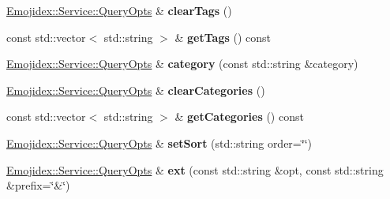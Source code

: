 \begin{DoxyCompactItemize}
\item 
\hyperlink{classEmojidex_1_1Service_1_1QueryOpts}{Emojidex\+::\+Service\+::\+Query\+Opts} \& {\bfseries clear\+Tags} ()\hypertarget{classEmojidex_1_1Service_1_1QueryOpts_a04cb66831c992b892b1ca80228bcffae}{}\label{classEmojidex_1_1Service_1_1QueryOpts_a04cb66831c992b892b1ca80228bcffae}

\item 
const std\+::vector$<$ std\+::string $>$ \& {\bfseries get\+Tags} () const \hypertarget{classEmojidex_1_1Service_1_1QueryOpts_a0085f26b918a3466ea8524e754f30598}{}\label{classEmojidex_1_1Service_1_1QueryOpts_a0085f26b918a3466ea8524e754f30598}

\item 
\hyperlink{classEmojidex_1_1Service_1_1QueryOpts}{Emojidex\+::\+Service\+::\+Query\+Opts} \& {\bfseries category} (const std\+::string \&category)\hypertarget{classEmojidex_1_1Service_1_1QueryOpts_a55bf6248156ed527d0cb1a469488c999}{}\label{classEmojidex_1_1Service_1_1QueryOpts_a55bf6248156ed527d0cb1a469488c999}

\item 
\hyperlink{classEmojidex_1_1Service_1_1QueryOpts}{Emojidex\+::\+Service\+::\+Query\+Opts} \& {\bfseries clear\+Categories} ()\hypertarget{classEmojidex_1_1Service_1_1QueryOpts_ad319ea44268d12872d7440697f86477a}{}\label{classEmojidex_1_1Service_1_1QueryOpts_ad319ea44268d12872d7440697f86477a}

\item 
const std\+::vector$<$ std\+::string $>$ \& {\bfseries get\+Categories} () const \hypertarget{classEmojidex_1_1Service_1_1QueryOpts_a70793f0fdaf87d80eb5343c45a58367e}{}\label{classEmojidex_1_1Service_1_1QueryOpts_a70793f0fdaf87d80eb5343c45a58367e}

\item 
\hyperlink{classEmojidex_1_1Service_1_1QueryOpts}{Emojidex\+::\+Service\+::\+Query\+Opts} \& {\bfseries set\+Sort} (std\+::string order=\char`\"{}\char`\"{})\hypertarget{classEmojidex_1_1Service_1_1QueryOpts_a5a187d4a45d838387f99196a70458173}{}\label{classEmojidex_1_1Service_1_1QueryOpts_a5a187d4a45d838387f99196a70458173}

\item 
\hyperlink{classEmojidex_1_1Service_1_1QueryOpts}{Emojidex\+::\+Service\+::\+Query\+Opts} \& {\bfseries ext} (const std\+::string \&opt, const std\+::string \&prefix=\char`\"{}\&\char`\"{})\hypertarget{classEmojidex_1_1Service_1_1QueryOpts_abc3b57ad07108e262eda4505cfdcc5c8}{}\label{classEmojidex_1_1Service_1_1QueryOpts_abc3b57ad07108e262eda4505cfdcc5c8}


\end{DoxyCompactItemize}
